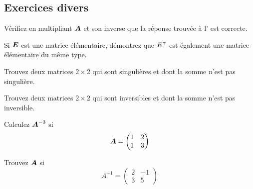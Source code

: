 \begin{TwoCol}
\section{Exercices divers}
\begin{exercice}
Vérifiez en multipliant $\boldsymbol{A}$ et son inverse que la réponse trouvée à l' est correcte.
\end{exercice}

 \begin{exercice}
 Si $\boldsymbol{E}$ est une matrice élémentaire, démontrez que $\transp{E}$ est également une matrice élémentaire du même type.
 \end{exercice}
 
  \begin{exercice}
Trouvez deux matrices $2\times2$ qui sont singulières et dont la somme n'est pas singulière.
 \end{exercice}
 
   \begin{exercice}
Trouvez deux matrices $2\times2$ qui sont inversibles et dont la somme n'est pas inversible.
 \end{exercice}
 
   \begin{exercice}
Calculez $\boldsymbol{A}^{-3}$ si
\[
\boldsymbol{A} = \begin{pmatrix}
1 & 2 \\
1 & 3
\end{pmatrix}
\]
 \end{exercice} 
 
 \begin{exercice}
 Trouvez $\boldsymbol{A}$ si
 \[
 A^{-1} = \begin{pmatrix}
 2 & -1 \\
 3 & 5
 \end{pmatrix}
 \]
 \end{exercice}
 

\end{TwoCol}
